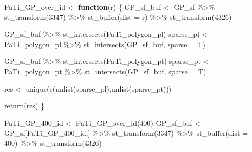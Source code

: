 \documentclass[
]{article}
\newenvironment{Shaded}{\begin{snugshade}}{\end{snugshade}}
\newcommand{\AttributeTok}[1]{\textcolor[rgb]{0.77,0.63,0.00}{#1}}
\newcommand{\ControlFlowTok}[1]{\textcolor[rgb]{0.13,0.29,0.53}{\textbf{#1}}}
\newcommand{\DecValTok}[1]{\textcolor[rgb]{0.00,0.00,0.81}{#1}}
\newcommand{\FunctionTok}[1]{\textcolor[rgb]{0.00,0.00,0.00}{#1}}
\newcommand{\NormalTok}[1]{#1}
\newcommand{\OtherTok}[1]{\textcolor[rgb]{0.56,0.35,0.01}{#1}}
\newcommand{\SpecialCharTok}[1]{\textcolor[rgb]{0.00,0.00,0.00}{#1}}
\begin{document}
\begin{Shaded}
\begin{Highlighting}[]
\NormalTok{PaTi\_GP\_over\_id }\OtherTok{\textless{}{-}} \ControlFlowTok{function}\NormalTok{(r) \{}
\NormalTok{  GP\_sf\_buf }\OtherTok{\textless{}{-}}\NormalTok{ GP\_sf }\SpecialCharTok{\%\textgreater{}\%}
    \FunctionTok{st\_transform}\NormalTok{(}\DecValTok{3347}\NormalTok{) }\SpecialCharTok{\%\textgreater{}\%}
    \FunctionTok{st\_buffer}\NormalTok{(}\AttributeTok{dist =}\NormalTok{ r) }\SpecialCharTok{\%\textgreater{}\%}
    \FunctionTok{st\_transform}\NormalTok{(}\DecValTok{4326}\NormalTok{)}
  
  
\NormalTok{  GP\_sf\_buf }\SpecialCharTok{\%\textgreater{}\%} \FunctionTok{st\_intersects}\NormalTok{(PaTi\_polygon\_pl)}
\NormalTok{  sparse\_pl }\OtherTok{\textless{}{-}}
\NormalTok{    PaTi\_polygon\_pl }\SpecialCharTok{\%\textgreater{}\%} \FunctionTok{st\_intersects}\NormalTok{(GP\_sf\_buf, }\AttributeTok{sparse =}\NormalTok{ T)}
  
  
\NormalTok{  GP\_sf\_buf }\SpecialCharTok{\%\textgreater{}\%} \FunctionTok{st\_intersects}\NormalTok{(PaTi\_polygon\_pt)}
\NormalTok{  sparse\_pt }\OtherTok{\textless{}{-}}
\NormalTok{    PaTi\_polygon\_pt }\SpecialCharTok{\%\textgreater{}\%} \FunctionTok{st\_intersects}\NormalTok{(GP\_sf\_buf, }\AttributeTok{sparse =}\NormalTok{ T)}
  
\NormalTok{  res }\OtherTok{\textless{}{-}} \FunctionTok{unique}\NormalTok{(}\FunctionTok{c}\NormalTok{(}\FunctionTok{unlist}\NormalTok{(sparse\_pl),}\FunctionTok{unlist}\NormalTok{(sparse\_pt)))}
  
  \FunctionTok{return}\NormalTok{(res)}
\NormalTok{\}}

\NormalTok{PaTi\_GP\_400\_id }\OtherTok{\textless{}{-}} \FunctionTok{PaTi\_GP\_over\_id}\NormalTok{(}\DecValTok{400}\NormalTok{)}
\NormalTok{GP\_sf\_buf }\OtherTok{\textless{}{-}}\NormalTok{ GP\_sf[PaTi\_GP\_400\_id,] }\SpecialCharTok{\%\textgreater{}\%}
    \FunctionTok{st\_transform}\NormalTok{(}\DecValTok{3347}\NormalTok{) }\SpecialCharTok{\%\textgreater{}\%}
    \FunctionTok{st\_buffer}\NormalTok{(}\AttributeTok{dist =} \DecValTok{400}\NormalTok{) }\SpecialCharTok{\%\textgreater{}\%}
    \FunctionTok{st\_transform}\NormalTok{(}\DecValTok{4326}\NormalTok{)}


\end{Highlighting}
\end{Shaded}
\end{document}
